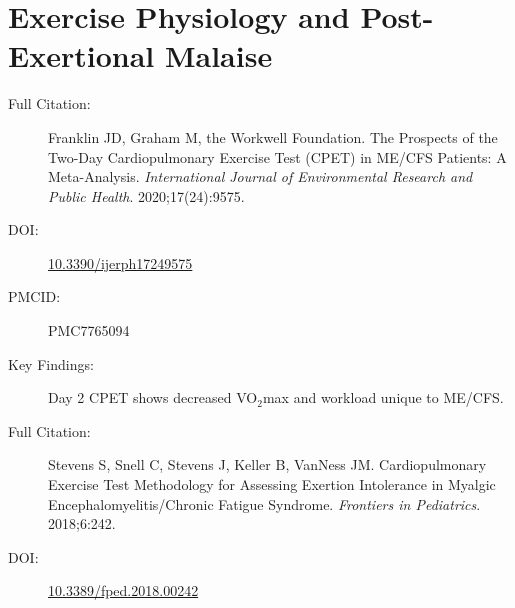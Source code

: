 \section{Exercise Physiology and Post-Exertional Malaise}
\label{sec:bib-exercise}

\begin{description}
    \item[Full Citation:] Franklin JD, Graham M, the Workwell Foundation. The Prospects of the Two-Day Cardiopulmonary Exercise Test (CPET) in ME/CFS Patients: A Meta-Analysis. \textit{International Journal of Environmental Research and Public Health}. 2020;17(24):9575.
    \item[DOI:] \href{https://doi.org/10.3390/ijerph17249575}{10.3390/ijerph17249575}
    \item[PMCID:] PMC7765094
    \item[Key Findings:] Day 2 CPET shows decreased VO$_2$max and workload unique to ME/CFS.
\end{description}

\begin{description}
    \item[Full Citation:] Stevens S, Snell C, Stevens J, Keller B, VanNess JM. Cardiopulmonary Exercise Test Methodology for Assessing Exertion Intolerance in Myalgic Encephalomyelitis/Chronic Fatigue Syndrome. \textit{Frontiers in Pediatrics}. 2018;6:242.
    \item[DOI:] \href{https://doi.org/10.3389/fped.2018.00242}{10.3389/fped.2018.00242}
\end{description}

